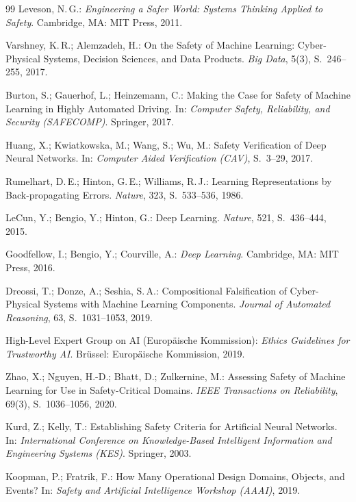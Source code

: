 ﻿\documentclass[12pt,a4paper]{article}
\begin{document}
\begin{thebibliography}{99}
Leveson, N.\,G.:
\textit{Engineering a Safer World: Systems Thinking Applied to Safety}.
Cambridge, MA: MIT Press, 2011.

Varshney, K.\,R.; Alemzadeh, H.:
On the Safety of Machine Learning: Cyber-Physical Systems, Decision Sciences, and Data Products.
\textit{Big Data}, 5(3), S.~246--255, 2017.

Burton, S.; Gauerhof, L.; Heinzemann, C.:
Making the Case for Safety of Machine Learning in Highly Automated Driving.
In: \textit{Computer Safety, Reliability, and Security (SAFECOMP)}.
Springer, 2017.

Huang, X.; Kwiatkowska, M.; Wang, S.; Wu, M.:
Safety Verification of Deep Neural Networks.
In: \textit{Computer Aided Verification (CAV)}, S.~3--29, 2017.

Rumelhart, D.\,E.; Hinton, G.\,E.; Williams, R.\,J.:
Learning Representations by Back-propagating Errors.
\textit{Nature}, 323, S.~533--536, 1986.

LeCun, Y.; Bengio, Y.; Hinton, G.:
Deep Learning.
\textit{Nature}, 521, S.~436--444, 2015.

Goodfellow, I.; Bengio, Y.; Courville, A.:
\textit{Deep Learning}.
Cambridge, MA: MIT Press, 2016.

Dreossi, T.; Donze, A.; Seshia, S.\,A.:
Compositional Falsification of Cyber-Physical Systems with Machine Learning Components.
\textit{Journal of Automated Reasoning}, 63, S.~1031--1053, 2019.

High-Level Expert Group on AI (Europäische Kommission):
\textit{Ethics Guidelines for Trustworthy AI}.
Brüssel: Europäische Kommission, 2019.

Zhao, X.; Nguyen, H.-D.; Bhatt, D.; Zulkernine, M.:
Assessing Safety of Machine Learning for Use in Safety-Critical Domains.
\textit{IEEE Transactions on Reliability}, 69(3), S.~1036--1056, 2020.

Kurd, Z.; Kelly, T.:
Establishing Safety Criteria for Artificial Neural Networks.
In: \textit{International Conference on Knowledge-Based Intelligent Information and Engineering Systems (KES)}.
Springer, 2003.

Koopman, P.; Fratrik, F.:
How Many Operational Design Domains, Objects, and Events?
In: \textit{Safety and Artificial Intelligence Workshop (AAAI)}, 2019.


\end{thebibliography}
\end{document}
